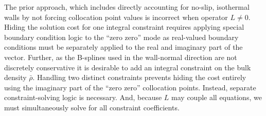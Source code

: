 \documentclass[letterpaper,11pt,nointlimits,reqno]{amsart}
\begin{document}
The prior approach, which includes directly accounting for no-slip, isothermal
walls by not forcing collocation point values is incorrect when operator $L
\neq 0$.  Hiding the solution cost for one integral constraint requires
applying special boundary condition logic to the ``zero zero'' mode as
real-valued boundary conditions must be separately applied to the real and
imaginary part of the vector.  Further, as the B-splines used in the
wall-normal direction are not discretely conservative it is desirable to add an
integral constraint on the bulk density $\bar{\rho}$.  Handling two distinct
constraints prevents hiding the cost entirely using the imaginary part of the
``zero zero'' collocation points.  Instead, separate constraint-solving logic
is necessary.  And, because $L$ may couple all equations, we must
simultaneously solve for all constraint coefficients.
\end{document}

